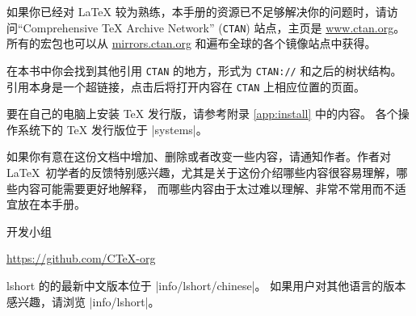 \bigskip
如果你已经对 \LaTeX{} 较为熟练，本手册的资源已不足够解决你的问题时，请访问``Comprehensive
\TeX{} Archive Network'' (\texttt{CTAN}) 站点，主页是 \url{www.ctan.org}。
所有的宏包也可以从 \url{mirrors.ctan.org} 和遍布全球的各个镜像站点中获得。

在本书中你会找到其他引用 \texttt{CTAN} 的地方，形式为 \texttt{CTAN://} 和之后的树状结构。
引用本身是一个超链接，点击后将打开内容在 \texttt{CTAN} 上相应位置的页面。

要在自己的电脑上安装 \TeX{} 发行版，请参考附录 \ref{app:install} 中的内容。
各个操作系统下的 \TeX{} 发行版位于 \CTAN|systems|。

\bigskip
如果你有意在这份文档中增加、删除或者改变一些内容，请通知作者。作者对 \LaTeX\
初学者的反馈特别感兴趣，尤其是关于这份介绍哪些内容很容易理解，哪些内容可能需要更好地解释，
而哪些内容由于太过难以理解、非常不常用而不适宜放在本手册。

\bigskip
\begin{flushright}
 开发小组\par
\url{https://github.com/CTeX-org}
\end{flushright}

\vfill

\noindent\begingroup\small lshort 的的最新中文版本位于 \CTAN|info/lshort/chinese|。
如果用户对其他语言的版本感兴趣，请浏览 \CTAN|info/lshort|。\endgroup

\endinput
